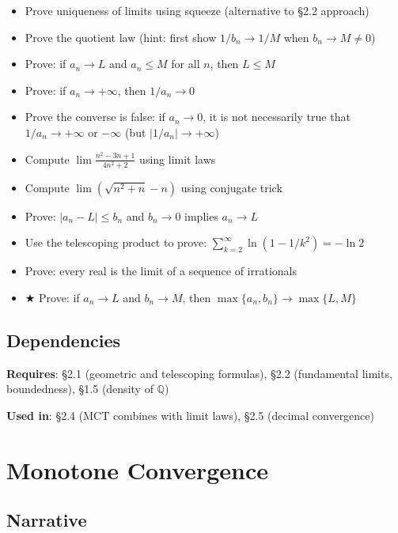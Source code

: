 \documentclass[
  10pt,
  letterpaper,
]{scrbook}
\providecommand{\tightlist}{%
  \setlength{\itemsep}{0pt}\setlength{\parskip}{0pt}}
\newcommand{\QQ}{\mathbb{Q}}
\begin{document}
\begin{itemize}
\tightlist
\item
  Prove uniqueness of limits using squeeze (alternative to §2.2
  approach)
\item
  Prove the quotient law (hint: first show \(1/b_n \to 1/M\) when
  \(b_n \to M \neq 0\))
\item
  Prove: if \(a_n \to L\) and \(a_n \leq M\) for all \(n\), then
  \(L \leq M\)
\item
  Prove: if \(a_n \to +\infty\), then \(1/a_n \to 0\)
\item
  Prove the converse is false: if \(a_n \to 0\), it is not necessarily
  true that \(1/a_n \to +\infty\) or \(-\infty\) (but
  \(|1/a_n| \to +\infty\))
\item
  Compute \(\lim \frac{n^2 - 3n + 1}{4n^2 + 2}\) using limit laws
\item
  Compute \(\lim (\sqrt{n^2 + n} - n)\) using conjugate trick
\item
  Prove: \(|a_n - L| \leq b_n\) and \(b_n \to 0\) implies \(a_n \to L\)
\item
  Use the telescoping product to prove:
  \(\sum_{k=2}^{\infty} \ln(1 - 1/k^2) = -\ln 2\)
\item
  Prove: every real is the limit of a sequence of irrationals
\item
  ★ Prove: if \(a_n \to L\) and \(b_n \to M\), then
  \(\max\{a_n, b_n\} \to \max\{L, M\}\)
\end{itemize}

\subsection{Dependencies}\label{dependencies-7}

\textbf{Requires}: §2.1 (geometric and telescoping formulas), §2.2
(fundamental limits, boundedness), §1.5 (density of \(\QQ\))

\textbf{Used in}: §2.4 (MCT combines with limit laws), §2.5 (decimal
convergence)

\section{Monotone Convergence}\label{monotone-convergence}

\subsection{Narrative}\label{narrative-8}
\end{document}
